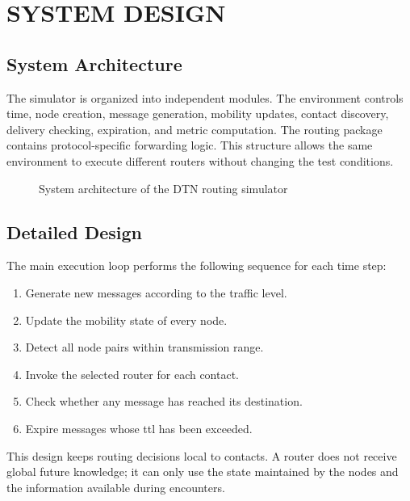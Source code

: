 \chapter{\MakeUppercase{System Design}}

\section{System Architecture}
The simulator is organized into independent modules. The environment controls time, node creation, message generation, mobility updates, contact discovery, delivery checking, expiration, and metric computation. The routing package contains protocol-specific forwarding logic. This structure allows the same environment to execute different routers without changing the test conditions.

\begin{figure}[h!]
    \centering
    \caption{System architecture of the DTN routing simulator}
    \label{fig:architecture_placeholder}
\end{figure}

\section{Detailed Design}
The main execution loop performs the following sequence for each time step:

\begin{enumerate}
	\item Generate new messages according to the traffic level.
	\item Update the mobility state of every node.
	\item Detect all node pairs within transmission range.
	\item Invoke the selected router for each contact.
	\item Check whether any message has reached its destination.
	\item Expire messages whose \ac{ttl} has been exceeded.
\end{enumerate}

This design keeps routing decisions local to contacts. A router does not receive global future knowledge; it can only use the state maintained by the nodes and the information available during encounters.

